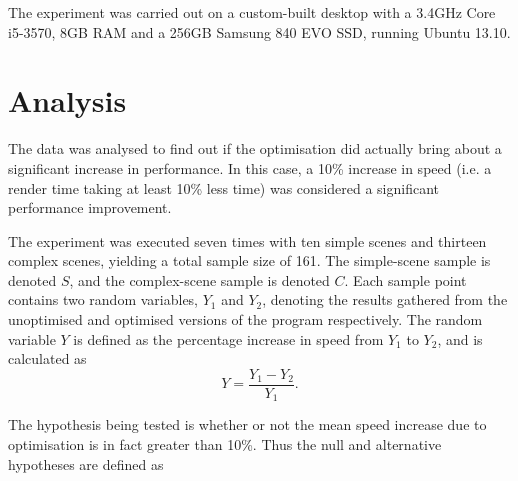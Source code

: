 \documentclass[a4paper]{article}
\begin{document}
The experiment was carried out on a custom-built desktop with a 3.4GHz Core i5-3570, 8GB RAM and a 256GB Samsung 840 EVO SSD, running Ubuntu 13.10.

\section{Analysis}
The data was analysed to find out if the optimisation did actually bring about a significant increase in performance. In this case, a 10\% increase in speed (i.e. a render time taking at least 10\% less time) was considered a significant performance improvement.

The experiment was executed seven times with ten simple scenes and thirteen complex scenes, yielding a total sample size of 161. The simple-scene sample is denoted $S$, and the complex-scene sample is denoted $C$. Each sample point contains two random variables, $Y_1$ and $Y_2$, denoting the results gathered from the unoptimised and optimised versions of the program respectively. The random variable $Y$ is defined as the percentage increase in speed from $Y_1$ to $Y_2$, and is calculated as
$$
Y = \frac{Y_1 - Y_2}{Y_1}.
$$

\vspace{10 mm}

\begin{center}
\end{center}

The hypothesis being tested is whether or not the mean speed increase due to optimisation is in fact greater than 10\%. Thus the null and alternative hypotheses are defined as
\end{document}
